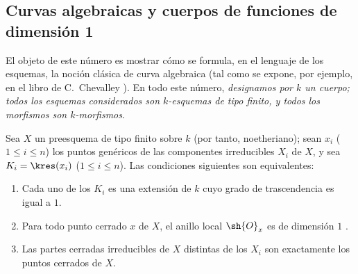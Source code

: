 \documentclass[oneside,10pt]{amsart}
\renewcommand{\leq}{\leqslant}
\newcommand{\oldpage}[2][]{\marginnote{\normalfont\footnotesize\textbf{#1}~|~#2}\ignorespaces}
\let\EGAOriginalLabel\label
\renewcommand{\label}[1]{\phantomsection\EGAOriginalLabel{#1}}
\begin{document}
\oldpage[II]{148}

\subsection{Curvas algebraicas y cuerpos de funciones de dimensión 1}
\label{subsection:II.7.4}

El objeto de este número es mostrar cómo se formula, en el lenguaje de los esquemas, la noción clásica de curva algebraica (tal como se expone, por ejemplo, en el libro de C.~Chevalley \cite{II-23}).
En todo este número, \emph{designamos por $k$ un cuerpo; todos los esquemas considerados son $k$-esquemas de tipo finito, y todos los morfismos son $k$-morfismos}.

\begin{proposition}[7.4.1]
\label{II.7.4.1}
Sea $X$ un preesquema de tipo finito sobre $k$ (por tanto, noetheriano);
sean $x_i$ ($1\leq i\leq n$) los puntos genéricos de las componentes irreducibles $X_i$ de $X$, y sea $K_i=\kres(x_i)$ ($1\leq i\leq n$).
Las condiciones siguientes son equivalentes:
\begin{enumerate}
    \item[\rm{(a)}] Cada uno de los $K_i$ es una extensión de $k$ cuyo grado de trascendencia es igual a $1$.
    \item[\rm{(b)}] Para todo punto cerrado $x$ de $X$, el anillo local $\sh{O}_x$ es de dimensión $1$ \textup{}.
    \item[\rm{(c)}] Las partes cerradas irreducibles de $X$ distintas de los $X_i$ son exactamente los puntos cerrados de $X$.
\end{enumerate}
\end{proposition}
\end{document}
